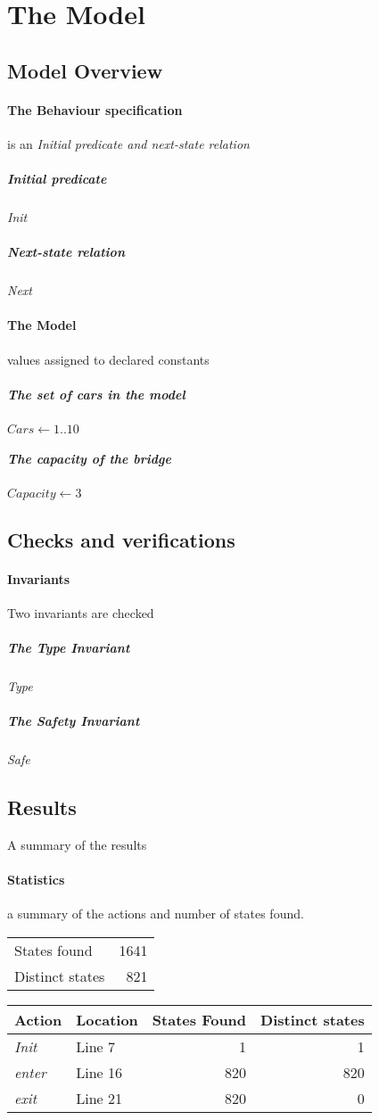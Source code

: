 \documentclass[12pt]{article}
\begin{document}
\section{The Model}
\subsection{Model Overview}
\paragraph{The Behaviour specification} is an \emph{Initial predicate and
next-state relation}
\subparagraph{Initial predicate} \textit{Init}
\subparagraph{Next-state relation} \textit{Next}

\paragraph{The Model} values assigned to declared constants
\subparagraph{The set of cars in the model} $\mathit{Cars} \leftarrow 1..10$
\subparagraph{The capacity of the bridge} $\mathit{Capacity} \leftarrow 3$
\subsection{Checks and verifications}
\paragraph{Invariants} Two invariants are checked
\subparagraph{The Type Invariant} \textit{Type}
\subparagraph{The Safety Invariant} \textit{Safe}

\subsection{Results} A summary of the results
\paragraph{Statistics} a summary of the actions and number of states
found.

\begin{table}[h]
\begin{tabular}{lr}
	States found & \num{1641} \\
 Distinct states & \num{821} \\ 
\end{tabular}
\end{table}

\begin{table}[h]
\begin{tabular}{llrr}
	\textbf{Action} & Location & States Found & \textbf{Distinct states} \\
	\hline
	\textit{Init}   & Line 7 & 1 & 1 \\
	\textit{enter}   & Line 16 & 820 & 820 \\
	\textit{exit}   & Line 21 & 820 & 0 \\
\end{tabular}
\end{table}
\end{document}
